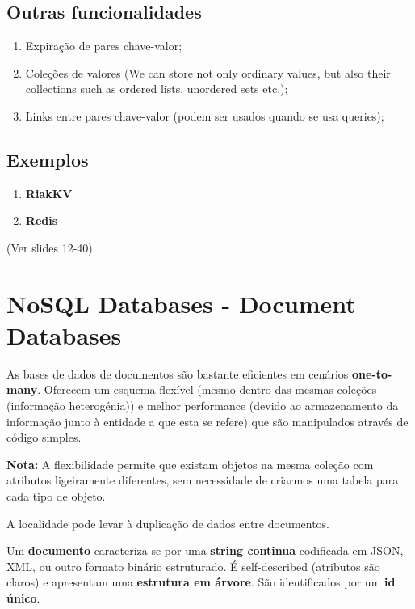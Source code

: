 \documentclass{article}
\begin{document}
\subsection{Outras funcionalidades}

\begin{enumerate}
  \item Expiração de  pares chave-valor;
  \item Coleções de valores (We can store not only ordinary values, but also their
  collections such as ordered lists, unordered sets etc.);
  \item Links entre pares chave-valor (podem ser usados quando se usa queries);
\end{enumerate}

\subsection{Exemplos}

\begin{enumerate}
  \item \textbf{RiakKV}
  \item \textbf{Redis}
\end{enumerate}

(Ver slides 12-40)

\section{NoSQL Databases - Document Databases}

As bases de dados de documentos são bastante eficientes em cenários \textbf{one-to-many}.
Oferecem um esquema flexível (mesmo dentro das mesmas coleções (informação heterogénia)) e melhor performance
(devido ao armazenamento da informação junto à entidade a que esta se refere) que são
manipulados através de código simples.

\begin{flushleft}
  \textbf{Nota:} A flexibilidade permite que existam objetos na mesma coleção com atributos ligeiramente diferentes, sem necessidade
  de criarmos uma tabela para cada tipo de objeto.

  A localidade pode levar à duplicação de dados entre documentos.
\end{flushleft}

Um \textbf{documento} caracteriza-se por uma \textbf{string continua} codificada em JSON, XML,
ou outro formato binário estruturado.
É self-described (atributos são claros) e apresentam uma \textbf{estrutura em árvore}. São
identificados por um \textbf{id único}.
\end{document}
